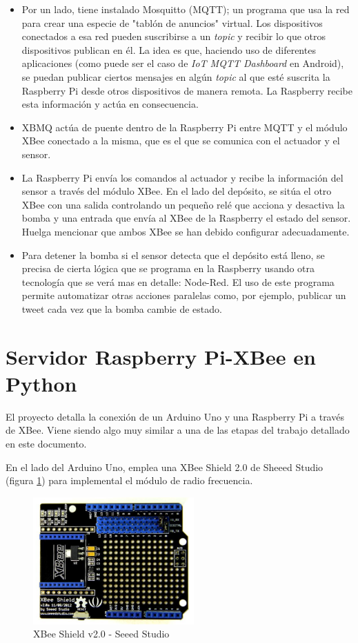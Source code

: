 \begin{itemize}
\item Por un lado, tiene instalado Mosquitto (MQTT); un programa que usa la red para crear una especie de "tablón de anuncios" virtual. Los dispositivos conectados a esa red pueden suscribirse a un \textit{topic} y recibir lo que otros dispositivos publican en él.
La idea es que, haciendo uso de diferentes aplicaciones (como puede ser el caso de \textit{IoT MQTT Dashboard} en Android), se puedan publicar ciertos mensajes en algún \textit{topic} al que esté suscrita la Raspberry Pi desde otros dispositivos de manera remota. La Raspberry recibe esta información y actúa en consecuencia.
\item XBMQ actúa de puente dentro de la Raspberry Pi entre MQTT y el módulo XBee conectado a la misma, que es el que se comunica con el actuador y el sensor.
\item La Raspberry Pi envía los comandos al actuador y recibe la información del sensor a través del módulo XBee. En el lado del depósito, se sitúa el otro XBee con una salida controlando un pequeño relé que acciona y desactiva la bomba y una entrada que envía al XBee de la Raspberry el estado del sensor. Huelga mencionar que ambos XBee se han debido configurar adecuadamente.
\item Para detener la bomba si el sensor detecta que el depósito está lleno, se precisa de cierta lógica que se programa en la Raspberry usando otra tecnología que se verá mas en detalle: Node-Red. El uso de este programa permite automatizar otras acciones paralelas como, por ejemplo, publicar un tweet cada vez que la bomba cambie de estado.
\end{itemize}

\section{Servidor Raspberry Pi-XBee en Python \cite{JONIUZ:IoT}}

El proyecto detalla la conexión de un Arduino Uno y una Raspberry Pi a través de XBee. Viene siendo algo muy similar a una de las etapas del trabajo detallado en este documento.

En el lado del Arduino Uno, emplea una XBee Shield 2.0 de Sheeed Studio (figura \ref{fig:EArte2}) para implemental el módulo de radio frecuencia.

\begin{figure}[tb]
\centering
\includegraphics[width=0.55\textwidth]{figuras/EArte2.png}
\caption{XBee Shield v2.0 - Seeed Studio}
\label{fig:EArte2}
\end{figure}

